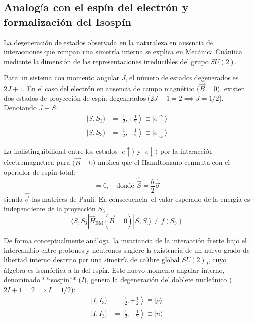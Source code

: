 \subsection{Analogía con el espín del electrón y formalización del Isospín}

La degeneración de estados observada en la naturaleza en ausencia de interacciones que rompan una simetría interna se explica en Mecánica Cuántica mediante la dimensión de las representaciones irreducibles del grupo $SU(2)$.

Para un sistema con momento angular $J$, el número de estados degenerados es $2J + 1$. En el caso del electrón en ausencia de campo magnético ($\vec{B} = 0$), existen dos estados de proyección de espín degenerados ($2J + 1 = 2 \implies J = 1/2$). Denotando $J \equiv S$:
\begin{align}
    |S, S_3\rangle &= \left| \frac{1}{2}, +\frac{1}{2} \right\rangle \equiv |e\uparrow\rangle \\
    |S, S_3\rangle &= \left| \frac{1}{2}, -\frac{1}{2} \right\rangle \equiv |e\downarrow\rangle
\end{align}

La indistinguibilidad entre los estados $|e\uparrow\rangle$ y $|e\downarrow\rangle$ por la interacción electromagnética pura ($\vec{B} = 0$) implica que el Hamiltoniano conmuta con el operador de espín total:
\begin{equation}
    [\hat{H}_{\text{EM}}(\vec{B}=0), \hat{\vec{S}}] = 0, \quad \text{donde } \hat{\vec{S}} = \frac{\hbar}{2} \hat{\vec{\sigma}}
\end{equation}
siendo $\hat{\vec{\sigma}}$ las matrices de Pauli. En consecuencia, el valor esperado de la energía es independiente de la proyección $S_3$:
\begin{equation}
    \langle S, S_3 | \hat{H}_{\text{EM}}(\vec{B}=0) | S, S_3 \rangle \neq f(S_3)
\end{equation}

De forma conceptualmente análoga, la invariancia de la interacción fuerte bajo el intercambio entre protones y neutrones sugiere la existencia de un nuevo grado de libertad interno descrito por una simetría de calibre global $SU(2)_I$, cuyo álgebra es isomórfica a la del espín. Este nuevo momento angular interno, denominado **isospín** ($I$), genera la degeneración del doblete nucleónico ($2I + 1 = 2 \implies I = 1/2$):
\begin{align}
    |I, I_3\rangle &= \left| \frac{1}{2}, +\frac{1}{2} \right\rangle \equiv |p\rangle \\
    |I, I_3\rangle &= \left| \frac{1}{2}, -\frac{1}{2} \right\rangle \equiv |n\rangle
\end{align}

